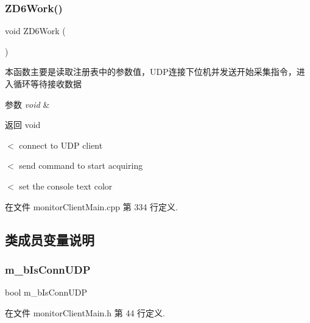 \subsubsection{\texorpdfstring{Z\+D6\+Work()}{ZD6Work()}}
{\footnotesize\ttfamily void Z\+D6\+Work (\begin{DoxyParamCaption}\item[{void}]{ }\end{DoxyParamCaption})\hspace{0.3cm}{\ttfamily [private]}}



本函数主要是读取注册表中的参数值，\+U\+D\+P连接下位机并发送开始采集指令，进入循环等待接收数据 


\begin{DoxyParams}{参数}
{\em void} & \\
\hline
\end{DoxyParams}
\begin{DoxyReturn}{返回}
void 
\end{DoxyReturn}
$<$ connect to U\+DP client

$<$ send command to start acquiring

$<$ set the console text color 

在文件 monitor\+Client\+Main.\+cpp 第 334 行定义.



\subsection{类成员变量说明}
\mbox{\label{classmonitor_client_frame_a287627229fcd6d4cbb96b4ad0e6d1497}} 
\subsubsection{\texorpdfstring{m\+\_\+b\+Is\+Conn\+U\+DP}{m\_bIsConnUDP}}
{\footnotesize\ttfamily bool m\+\_\+b\+Is\+Conn\+U\+DP\hspace{0.3cm}{\ttfamily [private]}}



在文件 monitor\+Client\+Main.\+h 第 44 行定义.

\mbox{\label{classmonitor_client_frame_afce4d0e6dc1121b650a15ef810ea569f}} 
